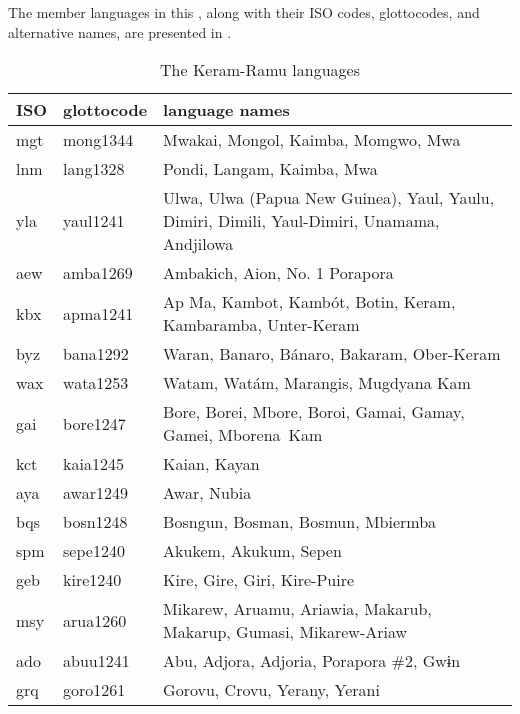 The member languages in this , along with their ISO codes, glottocodes, and alternative names, are presented in .


\begin{table}
\small
\caption{The Keram-Ramu languages}
\label{tab:1.14}
\begin{tabularx}{\textwidth}{llQ}
\lsptoprule
{}
ISO & glottocode & language names\\
\midrule
mgt & mong1344 & Mwakai, Mongol, Kaimba, Momgwo, Mwa\\
lnm & lang1328 & Pondi, Langam, Kaimba, Mwa\\
yla & yaul1241 & Ulwa, Ulwa (Papua New Guinea), Yaul, Yaulu, Dimiri, Dimili, Yaul-Dimiri, Unamama, Andjilowa\\
aew & amba1269 & Ambakich, Aion, No. 1 Porapora\\
kbx & apma1241 & Ap Ma, Kambot, Kambót, Botin, Keram, Kambaramba, Unter-Keram\\
byz & bana1292 & Waran, Banaro, Bánaro, Bakaram, Ober-Keram\\
wax & wata1253 & Watam, Watám, Marangis, Mugdyana Kam\\
gai & bore1247 & Bore, Borei, Mbore, Boroi, Gamai, Gamay, Gamei, \mbox{Mborena Kam}\\
kct & kaia1245 & Kaian, Kayan\\
aya & awar1249 & Awar, Nubia\\
bqs & bosn1248 & Bosngun, Bosman, Bosmun, Mbiermba\\
spm & sepe1240 & Akukem, Akukum, Sepen\\
geb & kire1240 & Kire, Gire, Giri, Kire-Puire\\
msy & arua1260 & Mikarew, Aruamu, Ariawia, Makarub, Makarup, Gumasi, Mikarew-Ariaw\\
ado & abuu1241 & Abu, Adjora, Adjoria, Porapora \#2, Gwɨn\\
grq & goro1261 & Gorovu, Crovu, Yerany, Yerani\\

\end{tabularx}
\end{table}

